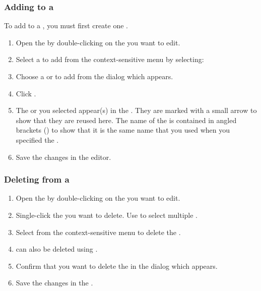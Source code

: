 \subsubsection{Adding \gdcases{} to a \gdsuite{}} 
\label{addtestsuite}
To add \gdcases{} to a \gdsuite{}, you must first create one .
\begin{enumerate}
\item Open the \gdtestsuiteeditor{} by double-clicking on the \gdsuite{} you want to edit.
\item Select a \gdcase{} to add from the context-sensitive menu by selecting:
\\


  \item Choose a \gdcase{} or \gdcases{} to add from the dialog which appears.
  \item Click . 
  \item The \gdcase{} or \gdcases{} you selected appear(s) in the \gdtestsuiteeditor{}. They are marked with a small arrow to show that they are reused here. The name of the \gdcase{} is contained in angled brackets (\bxshell{< >}) to show that it is the same name that you used when you specified the \gdcase{}. 

\item Save the changes in the editor.
\end{enumerate}

\subsubsection{Deleting \gdcases{} from a \gdsuite{}}
\label{TasksDeleteTCsFromSuite}
\begin{enumerate}
\item Open the \gdtestsuiteeditor{} by double-clicking on the \gdsuite{} you want to edit.
\item  Single-click the \gdcase{} you want to delete. Use   to select multiple \gdcases{}. 
\item Select  from the context-sensitive menu to delete the \gdcases{}.
\item \gdcases{} can also be deleted using .
\item Confirm that you want to delete the \gdcases{} in the dialog which appears.
\item Save the changes in the \gdtestsuiteeditor{}. 

\end{enumerate}

